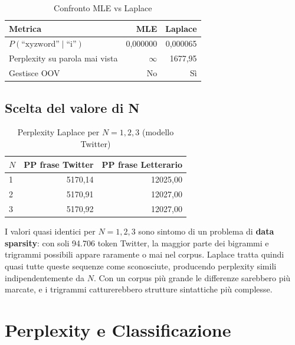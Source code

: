 \documentclass[12pt, a4paper]{article}
\begin{document}
\begin{table}[H]
\centering
\begin{tabular}{lrr}
\toprule
\textbf{Metrica} & \textbf{MLE} & \textbf{Laplace} \\
\midrule
$P(\text{``xyzword''} \mid \text{``i''})$ & 0,000000 & 0,000065 \\
Perplexity su parola mai vista            & $\infty$ & 1677,95  \\
Gestisce OOV\footnotemark                 & No       & Sì       \\
\bottomrule
\end{tabular}
\caption{Confronto MLE vs Laplace}
\end{table}

\subsection{Scelta del valore di N}

\begin{table}[H]
\centering
\begin{tabular}{lrr}
\toprule
$N$ & \textbf{PP frase Twitter} & \textbf{PP frase Letterario} \\
\midrule
1 & 5170,14 & 12025,00 \\
2 & 5170,91 & 12027,00 \\
3 & 5170,92 & 12027,00 \\
\bottomrule
\end{tabular}
\caption{Perplexity Laplace per $N=1,2,3$ (modello Twitter)}
\end{table}

I valori quasi identici per $N=1,2,3$ sono sintomo di un problema
di \textbf{data sparsity}: con soli 94.706 token Twitter, la
maggior parte dei bigrammi e trigrammi possibili appare raramente
o mai nel corpus. Laplace tratta quindi quasi tutte queste sequenze
come sconosciute, producendo perplexity simili indipendentemente da $N$.
Con un corpus più grande le differenze sarebbero più marcate, e i
trigrammi catturerebbero strutture sintattiche più complesse.

\section{Perplexity e Classificazione}
\end{document}
